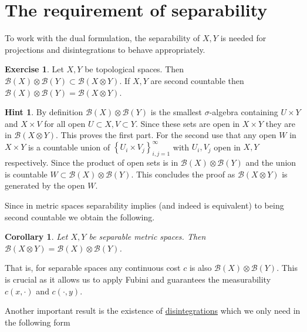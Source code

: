 \documentclass[
    a4paper,
    DIV=14,
    abstract=true,
    numbers=noenddot
]
{scrartcl}
\newtheorem{corollary}[corollary]{Corollary}
\theoremstyle{definition}
\newtheorem{exercise}{Exercise}
\newtheorem*{hint}{Hint}
\newcommand{\set}[1]{\left\{#1\right\}}
\newcommand{\Bb}{\mathcal{B}}
\begin{document}
\section{The requirement of separability}
To work with the dual formulation, the separability of $X,Y$ is needed for projections and disintegrations to behave appropriately.
\begin{exercise}\label{ex:separability gives equality}
    Let $X,Y$ be topological spaces. Then $\Bb (X) \otimes \Bb (Y) \subset \Bb(X \otimes Y)$. If $X,Y$ are second countable then $\Bb (X) \otimes \Bb (Y) = \Bb(X \otimes Y)$.
\end{exercise}
\begin{hint}
    By definition $\Bb (X) \otimes \Bb (Y) $ is the smallest $\sigma $-algebra containing $U \times Y$ and $X \times V$ for all open $U \subset X, V \subset Y$. Since these sets are open in $X \times Y$ they are in $\Bb(X \otimes Y)$. This proves the first part. For the second use that any open $ W $ in $X \times Y$ is a countable union of $\set{U_i \times V_j}_{i,j=1}^\infty$ with $U_i,V_j$ open in $X,Y$ respectively. Since the product of open sets is in $\Bb (X) \otimes \Bb (Y) $ and the union is countable $W \subset \Bb (X) \otimes \Bb (Y)$. This concludes the proof as $\Bb(X \otimes Y)$ is generated by the open $W$.
\end{hint}
Since in metric spaces separability implies (and indeed is equivalent) to being second countable we obtain the following.
\begin{corollary}
    Let $X,Y$ be separable metric spaces. Then $\Bb (X \otimes Y)=\Bb (X) \otimes \Bb (Y)$.
\end{corollary}
That is, for separable spaces any continuous cost $c$ is also $\Bb (X) \otimes \Bb (Y)$. This is crucial as it allows us to apply Fubini and guarantees the measurability $c(x, \cdot )$ and $c(\cdot ,y)$.

Another important result is the existence of \href{https://en.wikipedia.org/wiki/Disintegration_theorem}{disintegrations} which we only need in the following form \cite[III-70]{DellacherieMeyer1978}
\end{document}
